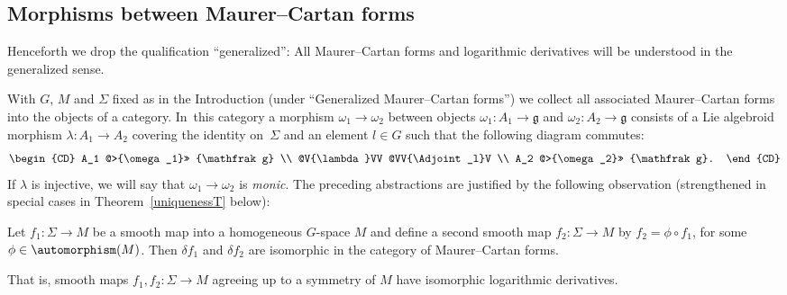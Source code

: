 \subsection*{Morphisms between Maurer--Cartan forms}

Henceforth we drop the qualification ``generalized'': All Maurer--Cartan
forms and logarithmic derivatives will be understood in the
generalized sense.

With $G$, $M$ and $\Sigma $ fixed as in the Introduction (under
``Generalized Maurer--Cartan forms'') we collect all associated
Maurer--Cartan forms into the objects of a category. In~this category a
morphism $\omega_1 \rightarrow \omega_2$ between objects
$\omega_1 \colon A_1 \rightarrow {\mathfrak g} $ and
$\omega_2 \colon A_2 \rightarrow {\mathfrak g} $ consists of a Lie
algebroid morphism $\lambda \colon A_1 \rightarrow A_2$ covering the
identity on~$\Sigma $ and an element $l \in G$ such that the following
diagram commutes:
 \begin{equation*}
 \begin{CD} A_1 @>{\omega_1}>> {\mathfrak g} \\ @V{\lambda}VV
@VV{\Adjoint_l}V \\ A_2 @>{\omega_2}>> {\mathfrak g}.
 \end{CD}
 \end{equation*} If $\lambda$ is injective, we will say that $\omega_1
\rightarrow \omega_2$ is {\it monic}. The preceding abstractions are
justified by the following observation (strengthened in special cases
in Theorem~\ref{uniquenessT} below):

\begin{Proposition}\label{morphismsP}
 Let $f_1\colon \Sigma \rightarrow M$ be a smooth map into a
 homogeneous $G$-space $M$ and define a second smooth map
 $f_2 \colon \Sigma \rightarrow M$ by $f_2 = \phi\circ f_1$, for
 some $\phi \in \automorphism(M)$. Then $\delta f_1$ and $\delta f_2$
 are isomorphic in the category of Maurer--Cartan forms.
\end{Proposition}

That is, smooth maps $f_1,f_2 \colon \Sigma \rightarrow M$ agreeing up
to a symmetry of $M$ have isomorphic logarithmic derivatives.


